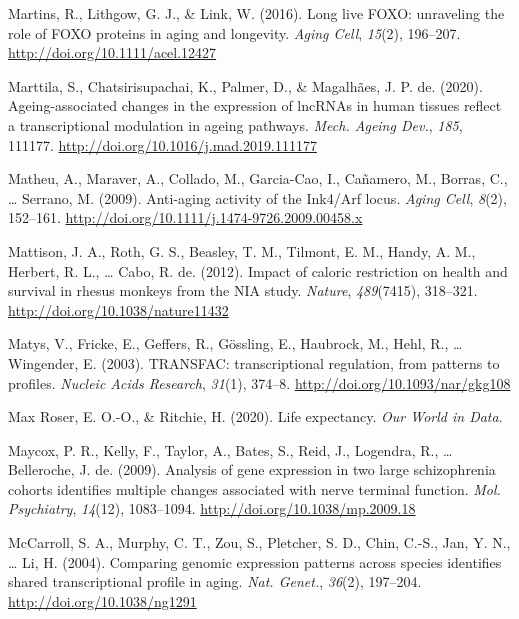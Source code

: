 \documentclass[12pt,twoside]{unicam}
\begin{document}
\begin{cslreferences}
\leavevmode\hypertarget{ref-Martins2016}{}%
Martins, R., Lithgow, G. J., \& Link, W. (2016). Long live FOXO: unraveling the role of FOXO proteins in aging and longevity. \emph{Aging Cell}, \emph{15}(2), 196--207. \url{http://doi.org/10.1111/acel.12427}

\leavevmode\hypertarget{ref-Marttila2020}{}%
Marttila, S., Chatsirisupachai, K., Palmer, D., \& Magalhães, J. P. de. (2020). Ageing-associated changes in the expression of lncRNAs in human tissues reflect a transcriptional modulation in ageing pathways. \emph{Mech. Ageing Dev.}, \emph{185}, 111177. \url{http://doi.org/10.1016/j.mad.2019.111177}

\leavevmode\hypertarget{ref-Matheu2009}{}%
Matheu, A., Maraver, A., Collado, M., Garcia-Cao, I., Cañamero, M., Borras, C., \ldots{} Serrano, M. (2009). Anti-aging activity of the Ink4/Arf locus. \emph{Aging Cell}, \emph{8}(2), 152--161. \url{http://doi.org/10.1111/j.1474-9726.2009.00458.x}

\leavevmode\hypertarget{ref-Mattison2012}{}%
Mattison, J. A., Roth, G. S., Beasley, T. M., Tilmont, E. M., Handy, A. M., Herbert, R. L., \ldots{} Cabo, R. de. (2012). Impact of caloric restriction on health and survival in rhesus monkeys from the NIA study. \emph{Nature}, \emph{489}(7415), 318--321. \url{http://doi.org/10.1038/nature11432}

\leavevmode\hypertarget{ref-Matys2003}{}%
Matys, V., Fricke, E., Geffers, R., Gössling, E., Haubrock, M., Hehl, R., \ldots{} Wingender, E. (2003). TRANSFAC: transcriptional regulation, from patterns to profiles. \emph{Nucleic Acids Research}, \emph{31}(1), 374--8. \url{http://doi.org/10.1093/nar/gkg108}

\leavevmode\hypertarget{ref-Roser2020}{}%
Max Roser, E. O.-O., \& Ritchie, H. (2020). Life expectancy. \emph{Our World in Data}.

\leavevmode\hypertarget{ref-Maycox2009}{}%
Maycox, P. R., Kelly, F., Taylor, A., Bates, S., Reid, J., Logendra, R., \ldots{} Belleroche, J. de. (2009). Analysis of gene expression in two large schizophrenia cohorts identifies multiple changes associated with nerve terminal function. \emph{Mol. Psychiatry}, \emph{14}(12), 1083--1094. \url{http://doi.org/10.1038/mp.2009.18}

\leavevmode\hypertarget{ref-McCarroll2004}{}%
McCarroll, S. A., Murphy, C. T., Zou, S., Pletcher, S. D., Chin, C.-S., Jan, Y. N., \ldots{} Li, H. (2004). Comparing genomic expression patterns across species identifies shared transcriptional profile in aging. \emph{Nat. Genet.}, \emph{36}(2), 197--204. \url{http://doi.org/10.1038/ng1291}


\end{cslreferences}
\end{document}
